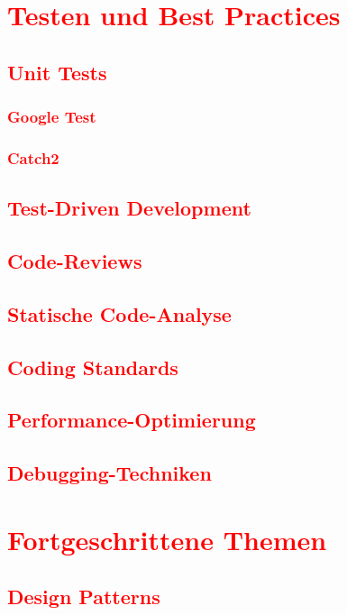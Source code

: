 \chapter{\textcolor{red}{Testen und Best Practices}}\label{chap:testing}
\section{\textcolor{red}{Unit Tests}}\label{sec:unit-tests}
\subsection{\textcolor{red}{Google Test}}\label{sec:google-test}
\subsection{\textcolor{red}{Catch2}}\label{sec:catch2}
\section{\textcolor{red}{Test-Driven Development}}\label{sec:tdd}
\section{\textcolor{red}{Code-Reviews}}\label{sec:code-reviews}
\section{\textcolor{red}{Statische Code-Analyse}}\label{sec:static-code-analysis}
\section{\textcolor{red}{Coding Standards}}\label{sec:coding-standards}
\section{\textcolor{red}{Performance-Optimierung}}\label{sec:performance-optimization}
\section{\textcolor{red}{Debugging-Techniken}}\label{sec:debugging-techniques}

\chapter{\textcolor{red}{Fortgeschrittene Themen}}\label{chap:advanced-topics}
\section{\textcolor{red}{Design Patterns}}\label{sec:design-patterns}
